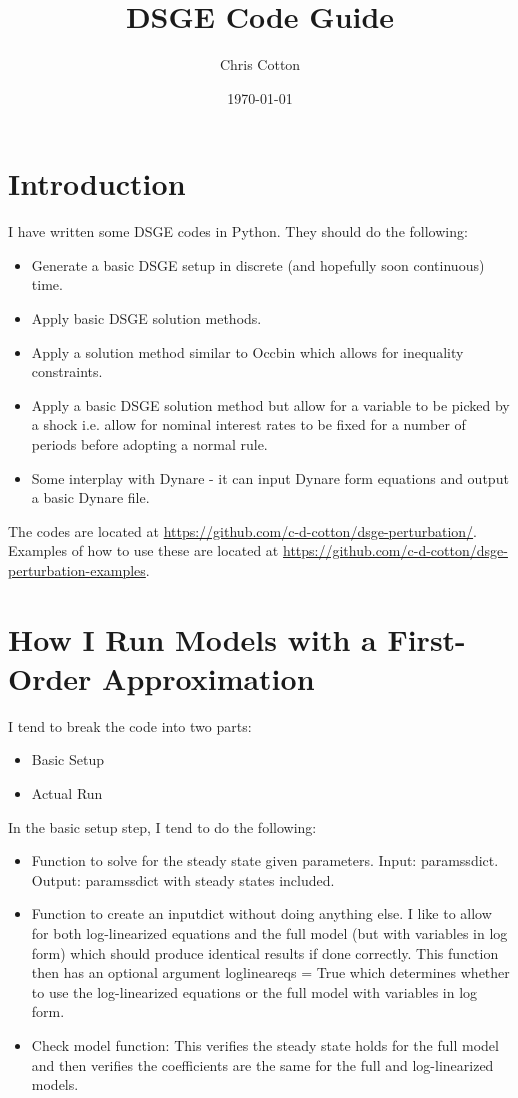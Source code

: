 \documentclass{article}
\theoremstyle{definition}
\begin{document}
\title{DSGE Code Guide}
\author{Chris Cotton}
\date{\today}
\maketitle

\section{Introduction}
I have written some DSGE codes in Python. They should do the following:
\begin{itemize}
    \item Generate a basic DSGE setup in discrete (and hopefully soon continuous) time.
    \item Apply basic DSGE solution methods.
    \item Apply a solution method similar to Occbin which allows for inequality constraints.
    \item Apply a basic DSGE solution method but allow for a variable to be picked by a shock i.e. allow for nominal interest rates to be fixed for a number of periods before adopting a normal rule.
    \item Some interplay with Dynare - it can input Dynare form equations and output a basic Dynare file.
\end{itemize}

The codes are located at \url{https://github.com/c-d-cotton/dsge-perturbation/}. Examples of how to use these are located at \url{https://github.com/c-d-cotton/dsge-perturbation-examples}.

\section{How I Run Models with a First-Order Approximation}
I tend to break the code into two parts:
\begin{itemize}
    \item Basic Setup
    \item Actual Run
\end{itemize}

In the basic setup step, I tend to do the following:
\begin{itemize}
    \item Function to solve for the steady state given parameters. Input: paramssdict. Output: paramssdict with steady states included.
    \item Function to create an inputdict without doing anything else. I like to allow for both log-linearized equations and the full model (but with variables in log form) which should produce identical results if done correctly. This function then has an optional argument loglineareqs = True which determines whether to use the log-linearized equations or the full model with variables in log form.
    \item Check model function: This verifies the steady state holds for the full model and then verifies the coefficients are the same for the full and log-linearized models.
\end{itemize}
\end{document}

